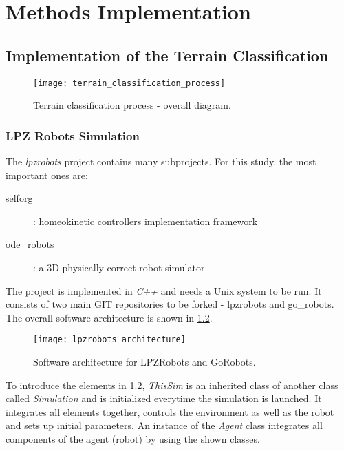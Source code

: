 \chapter{Methods Implementation} \label{app:implementation_details}

\section{Implementation of the Terrain Classification}

\begin{figure}[H]
  \centering
  \texttt{[image: terrain\_classification\_process]}
  \caption{Terrain classification process - overall diagram.}
  \label{img:app:terrain_classification_process}
\end{figure}

\subsection*{LPZ Robots Simulation} \label{ssec:app:lpzrobots_sim}
The \textit{lpzrobots} project contains many subprojects. For this study, the most important ones are:

\begin{description}
\item[selforg] : homeokinetic controllers implementation framework
\item[ode\_robots] : a 3D physically correct robot simulator
\end{description}

The project is implemented in \textit{C++} and needs a Unix system to be run. It consists of two main GIT repositories to be forked - lpzrobots and go\_robots. The overall software architecture is shown in \cref{img:lpzrobots_architecture}.

\begin{figure}[H]
  \centering
  \texttt{[image: lpzrobots\_architecture]}
  \caption{Software architecture for LPZRobots and GoRobots. \citep{misc:lpzrobots}}
  \label{img:lpzrobots_architecture}
\end{figure}

To introduce the elements in \cref{img:lpzrobots_architecture}, \textit{ThisSim} is an inherited class of another class called \textit{Simulation} and is initialized everytime the simulation is launched. It integrates all elements together, controls the environment as well as the robot and sets up initial parameters. An instance of the \textit{Agent} class integrates all components of the agent (robot) by using the shown classes.

